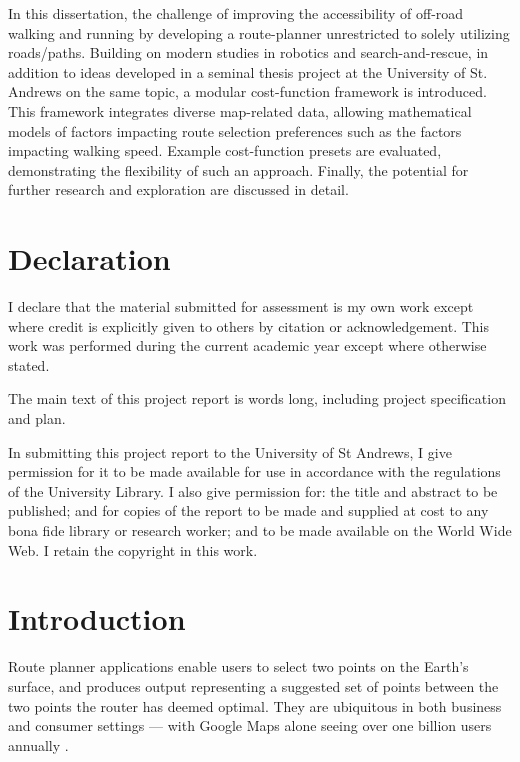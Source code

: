 \documentclass[12pt]{article}
\begin{document}
In this dissertation, the challenge of improving the accessibility of off-road walking and running by developing a route-planner unrestricted to solely utilizing roads/paths. Building on modern studies in robotics and search-and-rescue, in addition to ideas developed in a seminal thesis project at the University of St. Andrews on the same topic, a modular cost-function framework is introduced. This framework integrates diverse map-related data, allowing mathematical models of factors impacting route selection preferences such as the factors impacting walking speed. Example cost-function presets are evaluated, demonstrating the flexibility of such an approach. Finally, the potential for further research and exploration are discussed in detail.

\section*{Declaration}

I declare that the material submitted for assessment is
my own work except where credit is explicitly given to
others by citation or acknowledgement. This work was
performed during the current academic year except where
otherwise stated.

The main text of this project report is
words long, including project specification and plan.

In submitting this project report to the University of St
Andrews, I give permission for it to be made available for
use in accordance with the regulations of the University
Library. I also give permission for: the title and abstract to
be published; and for copies of the report to be made and
supplied at cost to any bona fide library or research
worker; and to be made available on the World Wide Web.
I retain the copyright in this work.

\pagebreak
\tableofcontents

\pagebreak
\pagestyle{fancy}

\section{Introduction}

Route planner applications enable users to select two points on the Earth's surface, and produces output representing a suggested set of points between the two points the router has deemed optimal. They are ubiquitous in both business and consumer settings --- with Google Maps alone seeing over one billion users annually \autocite{google2019keyword}.
\end{document}
